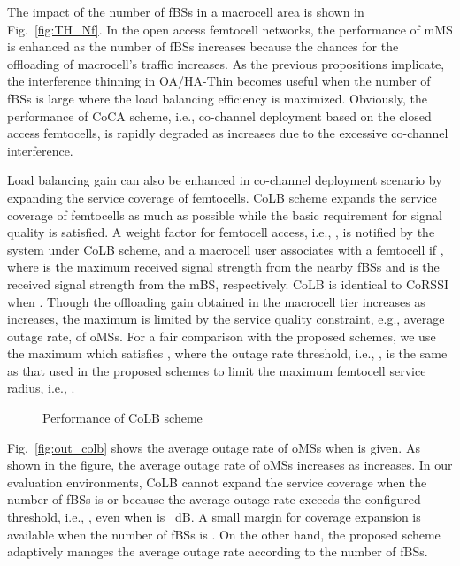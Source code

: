 \documentclass[journal]{IEEEtran}
\begin{document}
The impact of the number of fBSs in a macrocell area is shown in Fig.~\ref{fig:TH_Nf}.
In the open access femtocell networks, the performance of
mMS is enhanced as the number of fBSs increases because the chances for
the offloading of macrocell's traffic increases.
As the previous propositions
implicate, the interference thinning  in OA/HA-Thin becomes useful
when the number of fBSs is
large where the load balancing efficiency is maximized.
Obviously, the performance of CoCA scheme, i.e., co-channel deployment based on the
closed access femtocells, is rapidly degraded as  increases due to the excessive
co-channel interference.

Load balancing gain can also be enhanced
in co-channel deployment scenario by expanding
the service coverage of femtocells.
CoLB scheme expands the service coverage of femtocells
as much as possible while the basic requirement for
signal quality is satisfied.
A weight factor for femtocell access, i.e., ,
is notified by the system under CoLB scheme, and a macrocell user associates
with a femtocell if , where
 is the maximum received signal strength from
the nearby fBSs and  is the received signal strength from the mBS, respectively.
CoLB is identical to CoRSSI when .
Though the offloading gain obtained
in the macrocell tier increases as  increases, the maximum  is limited by the service quality constraint, e.g., average outage rate, of oMSs.
For a fair comparison with the proposed schemes, we use
the maximum  which satisfies , where the outage rate threshold, i.e.,  , is the same as that used in the proposed schemes to limit the maximum femtocell service radius, i.e., .

\begin{figure}
\centering {}
\caption{Performance of CoLB scheme} \label{fig:colb_simulations}
\end{figure}

Fig.~\ref{fig:out_colb} shows the average outage rate of oMSs
when  is given. As shown in the figure, the average outage
rate of oMSs increases as  increases.
In our evaluation environments, CoLB cannot expand the service
coverage when the number of fBSs is  or  because the average outage
rate exceeds the configured threshold, i.e., , even when
 is ~dB. A small margin for coverage expansion is available
when the number of fBSs is . On the other hand, the proposed scheme
adaptively manages the average outage rate according to the
number of fBSs.
\end{document}
